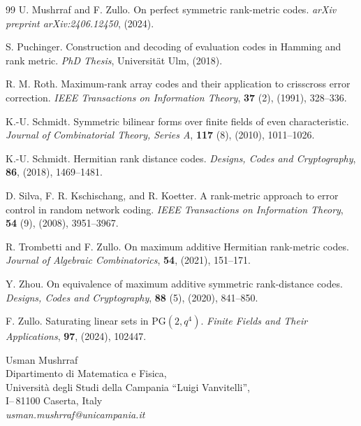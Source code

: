 \documentclass[12pt,a4paper]{article}
\begin{document}
\begin{thebibliography}{99}
 U. Mushrraf and F. Zullo. On perfect symmetric rank-metric codes. {\it arXiv preprint arXiv:2406.12450}, (2024).

 S. Puchinger. Construction and decoding of evaluation codes in Hamming and rank metric. {\it PhD Thesis}, Universität Ulm, (2018).

 R. M. Roth. Maximum-rank array codes and their application to crisscross error correction. {\it IEEE Transactions on Information Theory}, \textbf{37} (2), (1991), 328–336.

 K.-U. Schmidt. Symmetric bilinear forms over finite fields of even characteristic. {\it Journal of Combinatorial Theory, Series A}, \textbf{117} (8), (2010), 1011–1026.

 K.-U. Schmidt. Hermitian rank distance codes. {\it Designs, Codes and Cryptography}, \textbf{86}, (2018), 1469–1481.

 D. Silva, F. R. Kschischang, and R. Koetter. A rank-metric approach to error control in random network coding. {\it IEEE Transactions on Information Theory}, \textbf{54} (9), (2008), 3951–3967.

 R. Trombetti and F. Zullo. On maximum additive Hermitian rank-metric codes. {\it Journal of Algebraic Combinatorics}, \textbf{54}, (2021), 151–171.

 Y. Zhou. On equivalence of maximum additive symmetric rank-distance codes. {\it Designs, Codes and Cryptography}, \textbf{88} (5), (2020), 841–850.

 F. Zullo. Saturating linear sets in PG$(2, q^4)$. {\it Finite Fields and Their Applications}, \textbf{97}, (2024), 102447.

\end{thebibliography}



Usman Mushrraf \\
Dipartimento di Matematica e Fisica,\\
Universit\`a degli Studi della Campania ``Luigi Vanvitelli'',\\
I--\,81100 Caserta, Italy\\
{{\em usman.mushrraf@unicampania.it}}
\end{document}
